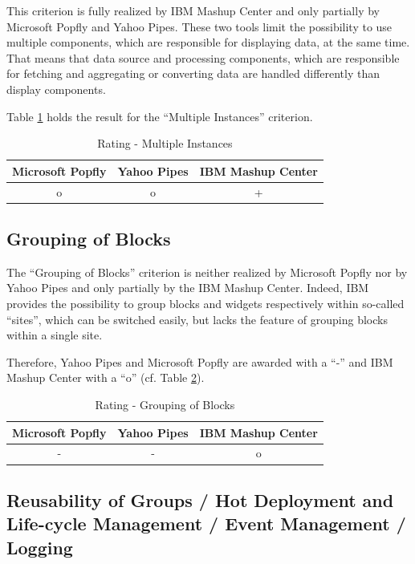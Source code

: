 This criterion is fully realized by IBM Mashup Center and only partially by Microsoft Popfly and
Yahoo Pipes. These two tools limit the possibility to use multiple components, which are responsible
for displaying data, at the same time. That means that data source and processing components, which
are responsible for fetching and aggregating or converting data are handled differently than
display components.

Table \ref{tab:RatingMultipleInstances} holds the result for the ``Multiple Instances'' criterion.

\begin{table}[h]
	\centering
		\begin{tabular}{|c|c|c|}
			\hline
				\textbf{Microsoft Popfly} & \textbf{Yahoo Pipes} & \textbf{IBM Mashup Center}\\
				\hline\hline
				o & o & +\\
			\hline
		\end{tabular}
	\caption{Rating - Multiple Instances}
	\label{tab:RatingMultipleInstances}
\end{table}

\subsection{Grouping of Blocks}

The ``Grouping of Blocks'' criterion is neither realized by Microsoft Popfly nor by Yahoo Pipes
and only partially by the IBM Mashup Center. Indeed, IBM provides the possibility to group blocks
and widgets respectively within so-called ``sites'', which can be switched easily, but lacks the
feature of grouping blocks within a single site.

Therefore, Yahoo Pipes and Microsoft Popfly are awarded with a ``-'' and IBM Mashup Center with a
``o'' (cf. Table \ref{tab:RatingGroupingOfBlocks}).

\begin{table}[h]
	\centering
		\begin{tabular}{|c|c|c|}
			\hline
				 \textbf{Microsoft Popfly} & \textbf{Yahoo Pipes} & \textbf{IBM Mashup Center}\\
				\hline\hline
				- & - & o\\
			\hline
		\end{tabular}
	\caption{Rating - Grouping of Blocks}
	\label{tab:RatingGroupingOfBlocks}
\end{table}

\subsection{Reusability of Groups / Hot Deployment and Life-cycle Management / Event Management /
Logging}

